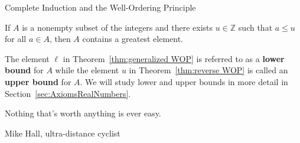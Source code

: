 \begin{section}{Complete Induction and the Well-Ordering Principle}
\begin{theorem}\label{thm:reverse WOP}
If $A$ is a nonempty subset of the integers and there exists $u\in \mathbb{Z}$ such that $a\leq u$ for all $a\in A$, then $A$ contains a greatest element.
\end{theorem}

The element $\ell$ in Theorem~\ref{thm:generalized WOP} is referred to as a \textbf{lower bound} for $A$ while the element $u$ in Theorem~\ref{thm:reverse WOP} is called an \textbf{upper bound} for $A$. We will study lower and upper bounds in more detail in Section~\ref{sec:AxiomsRealNumbers}.

\epigraph{Nothing that's worth anything is ever easy.}{Mike Hall, ultra-distance cyclist}

\end{section}